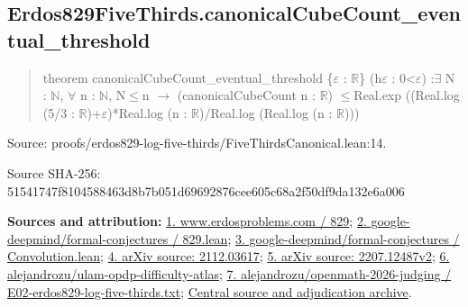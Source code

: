\documentclass[11pt,a4paper]{article}
\begin{document}
\begin{samepage}
\subsection{Erdos829FiveThirds.canonicalCubeCount\_eventual\_threshold}
\begin{quote}\small\ttfamily theorem canonicalCubeCount\_eventual\_threshold \{\ensuremath{\varepsilon} : \ensuremath{\mathbb{R}}\} (h\ensuremath{\varepsilon} : 0<\ensuremath{\varepsilon}) :\newline     \ensuremath{\exists} N : \ensuremath{\mathbb{N}}, \ensuremath{\forall} n : \ensuremath{\mathbb{N}}, N\ensuremath{\leq}n \ensuremath{\to} (canonicalCubeCount n : \ensuremath{\mathbb{R}}) \ensuremath{\leq}\newline       Real.exp ((Real.log (5/3 : \ensuremath{\mathbb{R}})+\ensuremath{\varepsilon})*Real.log (n : \ensuremath{\mathbb{R}})/Real.log (Real.log (n : \ensuremath{\mathbb{R}})))\end{quote}
{\small Source: proofs/erdos829-log-five-thirds/FiveThirdsCanonical.lean:14.\par}

{\small Source SHA-256: 51541747f8104588463d8b7b051d69692876cee605c68a2f50df9da132e6a006\par}

{\small\textbf{Sources and attribution:} \href{https://www.erdosproblems.com/829}{1. www.erdosproblems.com / 829}; \href{https://github.com/google-deepmind/formal-conjectures/blob/main/FormalConjectures/ErdosProblems/829.lean}{2. google-deepmind/formal-conjectures / 829.lean}; \href{https://github.com/google-deepmind/formal-conjectures/blob/main/FormalConjecturesForMathlib/Combinatorics/Additive/Convolution.lean}{3. google-deepmind/formal-conjectures / Convolution.lean}; \href{https://arxiv.org/html/2112.03617}{4. arXiv source: 2112.03617}; \href{https://arxiv.org/html/2207.12487v2}{5. arXiv source: 2207.12487v2}; \href{https://github.com/alejandrozu/ulam-opdp-difficulty-atlas}{6. alejandrozu/ulam-opdp-difficulty-atlas}; \href{https://github.com/alejandrozu/openmath-2026-judging/blob/d0ed487f487fa7ec814ff705ab55249983fe8707/OpenMath-Judging/review/entries/E02-erdos829-log-five-thirds.txt}{7. alejandrozu/openmath-2026-judging / E02-erdos829-log-five-thirds.txt}; \href{https://github.com/alejandrozu/openmath-2026-judging}{Central source and adjudication archive}.\par}

\end{samepage}
\end{document}
